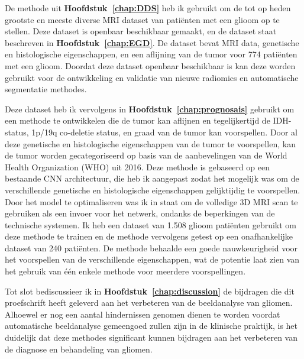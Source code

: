 De methode uit \textbf{Hoofdstuk~\ref{chap:DDS}} heb ik gebruikt om de tot op heden grootste en meeste diverse MRI dataset van pati{\"e}nten met een glioom op te stellen.
Deze dataset is openbaar beschikbaar gemaakt, en de dataset staat beschreven in \textbf{Hoofdstuk~\ref{chap:EGD}}.
De dataset bevat MRI data, genetische en histologische eigenschappen, en een aflijning van de tumor voor 774 pati{\"e}nten met een glioom.
Doordat deze dataset openbaar beschikbaar is kan deze worden gebruikt voor de ontwikkeling en validatie van nieuwe radiomics en automatische segmentatie methodes.

Deze dataset heb ik vervolgens in \textbf{Hoofdstuk~\ref{chap:prognosais}} gebruikt om een methode te ontwikkelen die de tumor kan aflijnen en tegelijkertijd de IDH-status, 1p/19q co-deletie status, en graad van de tumor kan voorspellen.
Door al deze genetische en histologische eigenschappen van de tumor te voorspellen, kan de tumor worden gecategoriseerd op basis van de aanbevelingen van de World Health Organization (WHO) uit 2016.
Deze methode is gebaseerd op een bestaande CNN architectuur, die heb ik aangepast zodat het mogelijk was om de verschillende genetische en histologische eigenschappen gelijktijdig te voorspellen.
Door het model te optimaliseren was ik in staat om de volledige 3D MRI scan te gebruiken als een invoer voor het netwerk, ondanks de beperkingen van de technische systemen.
Ik heb een dataset van 1.508 glioom pati{\"e}nten gebruikt om deze methode te trainen en de methode vervolgens getest op een onafhankelijke dataset van 240 pati{\"e}nten.
De methode behaalde een goede nauwkeurigheid voor het voorspellen van de verschillende eigenschappen, wat de potentie laat zien van het gebruik van {\'e}{\'e}n enkele methode voor meerdere voorspellingen.

Tot slot bediscussieer ik in \textbf{Hoofdstuk~\ref{chap:discussion}} de bijdragen die dit proefschrift heeft geleverd aan het verbeteren van de beeldanalyse van gliomen.
Alhoewel er nog een aantal hindernissen genomen dienen te worden voordat automatische beeldanalyse gemeengoed zullen zijn in de klinische praktijk, is het duidelijk dat deze methodes significant kunnen bijdragen aan het verbeteren van de diagnose en behandeling van gliomen.


